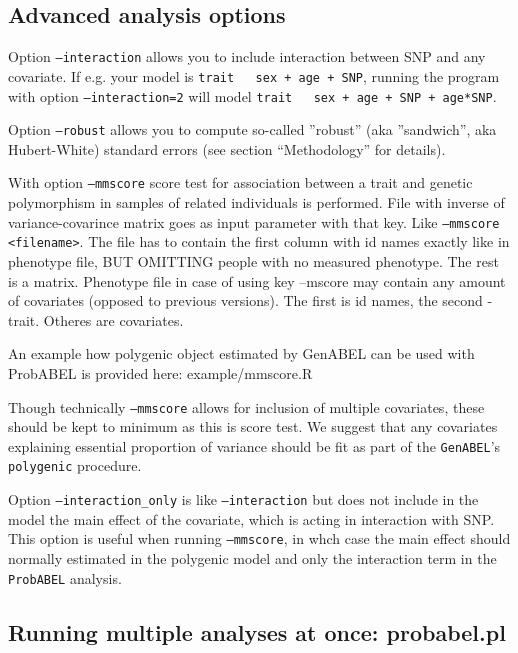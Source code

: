 \documentclass[12pt]{article}
\begin{document}
\subsection{Advanced analysis options}

Option \texttt{--interaction} allows you to include interaction between SNP 
and any covariate. If e.g. your model is \texttt{trait ~ sex + age + SNP}, 
running the program with option \texttt{--interaction=2} will model 
\texttt{trait ~ sex + age + SNP + age*SNP}.

Option \texttt{--robust} allows you to compute so-called ''robust'' (aka
''sandwich'', aka Hubert-White) standard errors (see section ``Methodology''
for details).

With option \texttt{--mmscore} score test for association between a trait and genetic
polymorphism  in samples of related individuals is performed. File with inverse of variance-covarince matrix goes as input parameter
with that key. Like \texttt{--mmscore <filename>}. The file has to contain the first column with id names exactly like in phenotype file, BUT OMITTING people with no measured phenotype. The rest is a matrix.
Phenotype file in case of using key --mscore may contain any amount of covariates (opposed to previous versions). The first is id names, the second - trait. 
Otheres are covariates.

An example how polygenic object estimated by GenABEL can be used with ProbABEL
is provided here: example/mmscore.R

Though technically \texttt{--mmscore} allows for inclusion of multiple 
covariates, these should be kept to minimum as this is score test. We suggest 
that any covariates explaining essential proportion of variance should be 
fit as part of the \texttt{GenABEL}'s \texttt{polygenic} procedure.

Option \texttt{--interaction\_only} is like \texttt{--interaction} but does not
include in the model the main effect of the covariate, which is acting in
interaction with SNP. This option is useful when running \texttt{--mmscore}, 
in whch case the main effect should normally estimated in the polygenic 
model and only the interaction term in the \texttt{ProbABEL} analysis.

\subsection{Running multiple analyses at once: probabel.pl}
\end{document}
